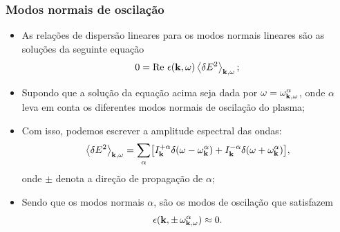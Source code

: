 \documentclass[10pt,aspectratio=1610,lualatex]{beamer}
\begin{document}
\begin{frame}
  \frametitle{Modos normais de oscilação}
  \begin{itemize}
    \item As relações de dispersão lineares para os modos normais lineares
    são as soluções da seguinte equação
    \begin{equation}
      0=\mbox{Re}\ \epsilon({\bf k},\omega)
      \left<\delta E^2 \right>_{{\bf k},\omega};
      \label{real-lin}
    \end{equation}
    \item Supondo que a solução da equação acima seja dada por
    $\omega=\omega^{\alpha}_{{\bf k},\omega}$, onde $\alpha$ leva em
    conta os diferentes modos normais de oscilação do plasma;
    \vspace{0.2cm}
    \item Com isso, podemos escrever a amplitude espectral das ondas:
    \begin{equation}
      \left<\delta E^2\right>_{{\bf k},\omega}
      =\sum_{\alpha}\bigl[I^{+\alpha}_{\bf k}
      \delta(\omega-\omega_{\bf k}^{\alpha})
      +I^{-\alpha}_{\bf k} \delta(\omega+\omega_{\bf k}^{\alpha})\bigr],
      \label{wave-dens}
    \end{equation}
    onde $\pm$ denota a direção de propagação de $\alpha$;
    \vspace{0.2cm}
    \item Sendo que os modos normais $\alpha$, são os modos de
    oscilação que satisfazem
    \begin{equation}
      \label{eigenmode}
      \epsilon({\bf k,\pm\, \omega_{{\bf k},\omega}^\alpha}) \approx 0.
    \end{equation}
  \end{itemize}
\end{frame}
\end{document}
